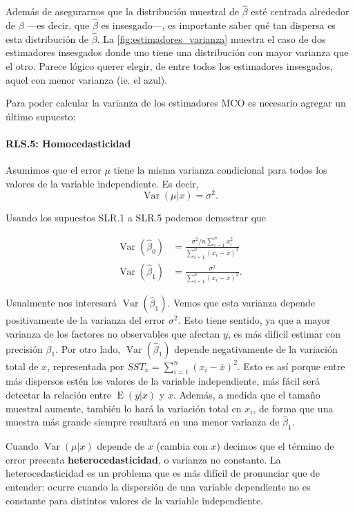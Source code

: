 \documentclass[12pt]{report}\usepackage[]{graphicx}\usepackage[]{color}
\newcommand*{\kw}[1]{\textbf{#1}\index{#1}}
\newcommand{\Var}{\operatorname{Var}}
\newcommand{\E}{\operatorname{E}}
\begin{document}
Además de asegurarnos que la distribución muestral de $\hat\beta$ esté centrada alrededor de $\beta$ ---es decir, que $\hat\beta$ es insesgado---, es importante saber qué tan dispersa es esta distribución de $\hat\beta$.
La \autoref{fig:estimadores_varianza} muestra el caso de dos estimadores insesgados donde uno tiene una distribución con mayor varianza que el otro.
Parece lógico querer elegir, de entre todos los estimadores insesgados, aquel con menor varianza (ie. el azul).

Para poder calcular la varianza de los estimadores MCO es necesario agregar un último supuesto:

\paragraph{RLS.5: Homocedasticidad} 
Asumimos que el error $\mu$ tiene la misma varianza condicional para todos los valores de la variable independiente. Es decir,
\begin{equation}
\Var(\mu | x) = \sigma^2.
\end{equation}

Usando los supuestos SLR.1 a SLR.5 podemos demostrar que

\begin{align}
\Var(\hat\beta_0) &= \frac{\sigma^2/n \sum_{i=1}^n x_i^2}{\sum_{i=1}^n (x_i - \overline x)^2} \label{eq:var_hat_beta0} \\
\Var(\hat\beta_1) &= \frac{\sigma^2}{\sum_{i=1}^n (x_i - \overline x)^2}.\label{eq:var_hat_beta1}
\end{align}

Usualmente nos interesará $\Var(\hat\beta_1)$.
Vemos que esta varianza depende positivamente de la varianza del error $\sigma^2$. Esto tiene sentido, ya que a mayor varianza de los factores no observables que afectan $y$, es más difícil estimar con precisión $\beta_1$.
Por otro lado, $\Var(\hat\beta_1)$ depende negativamente de la variación total de $x$, representada por $SST_x = \sum_{i=1}^n (x_i - \overline x)^2$. Esto es así porque entre más dispersos estén los valores de la variable independiente, más fácil será detectar la relación entre $\E(y|x)$ y $x$.
Además, a medida que el tamaño muestral aumente, también lo hará la variación total en $x_i$, de forma que una muestra más grande siempre resultará en una menor varianza de $\hat\beta_1$.

Cuando $\Var(\mu | x)$ depende de $x$ (cambia con $x$) decimos que el término de error presenta \kw{heterocedasticidad}, o varianza no constante.
La heterocedasticidad es un problema que es más difícil de pronunciar que de entender: ocurre cuando la dispersión de una variable dependiente no es constante para distintos valores de la variable independiente.
\end{document}
